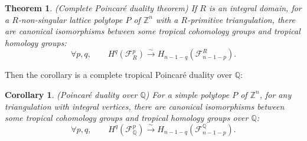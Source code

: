 \documentclass{article}
\newtheorem{theorem}{Theorem}
\newtheorem{corollary}{Corollary}
\begin{document}
\begin{theorem}
    (Complete Poincaré duality theorem) If $R$ is an integral domain, for a $R$-non-singular lattice polytope $P$ of $\mathbb{Z}^n$ with a $R$-primitive triangulation, there are canonical isomorphisms between some tropical cohomology groups and tropical homology groups:
    \begin{equation*}
        \forall p,q,~~~~~~~~~H^q(\mathcal{F}^p_{R}) \xrightarrow{\sim}H_{n-1-q}(\mathcal{F}_{n-1-p}^{R}).
    \end{equation*}
    \label{comp}
\end{theorem}

Then the corollary is a complete tropical Poincaré duality over $\mathbb{Q}$:

\begin{corollary}
    (Poincaré duality over $\mathbb{Q}$) For a simple polytope $P$ of $\mathbb{Z}^n$, for any triangulation with integral vertices, there are canonical isomorphisms between some tropical cohomology groups and tropical homology groups over $\mathbb{Q}$:
    \begin{equation*}
        \forall p,q,~~~~~~~~~H^q(\mathcal{F}^p_{\mathbb{Q}}) \xrightarrow{\sim}H_{n-1-q}(\mathcal{F}_{n-1-p}^{\mathbb{Q}}).
    \end{equation*}
\end{corollary}
\end{document}
